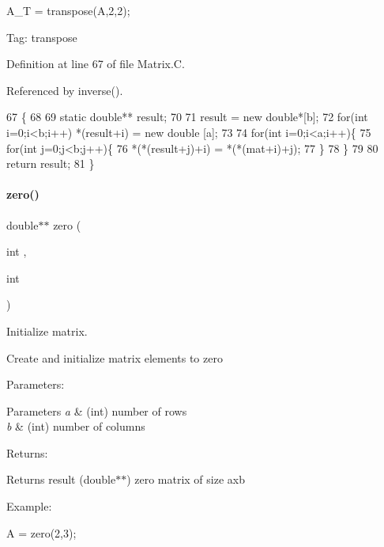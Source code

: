 A\+\_\+T = transpose(\+A,2,2);

Tag\+: transpose 

Definition at line 67 of file Matrix.\+C.



Referenced by inverse().


\begin{DoxyCode}
67                                               \{
68 
69     \textcolor{keyword}{static} \textcolor{keywordtype}{double}** result;
70 
71     result = \textcolor{keyword}{new} \textcolor{keywordtype}{double}*[b];
72     \textcolor{keywordflow}{for}(\textcolor{keywordtype}{int} i=0;i<b;i++) *(result+i) = \textcolor{keyword}{new} \textcolor{keywordtype}{double} [a];
73 
74     \textcolor{keywordflow}{for}(\textcolor{keywordtype}{int} i=0;i<a;i++)\{
75         \textcolor{keywordflow}{for}(\textcolor{keywordtype}{int} j=0;j<b;j++)\{
76             *(*(result+j)+i) = *(*(mat+i)+j);
77         \}
78     \}
79 
80     \textcolor{keywordflow}{return} result;
81 \}
\end{DoxyCode}
\mbox{\label{Matrix_8C_ab8a4d647abae3e1b8dd318f1db696bc6}} 
\paragraph{\texorpdfstring{zero()}{zero()}}
{\footnotesize\ttfamily double$\ast$$\ast$ zero (\begin{DoxyParamCaption}\item[{int}]{,  }\item[{int}]{ }\end{DoxyParamCaption})}



Initialize matrix. 

Create and initialize matrix elements to zero

Parameters\+: 
\begin{DoxyParams}{Parameters}
{\em a} & (int) number of rows \\
\hline
{\em b} & (int) number of columns\\
\hline
\end{DoxyParams}
Returns\+: \begin{DoxyReturn}{Returns}
result (double$\ast$$\ast$) zero matrix of size axb
\end{DoxyReturn}
Example\+:

A = zero(2,3);

